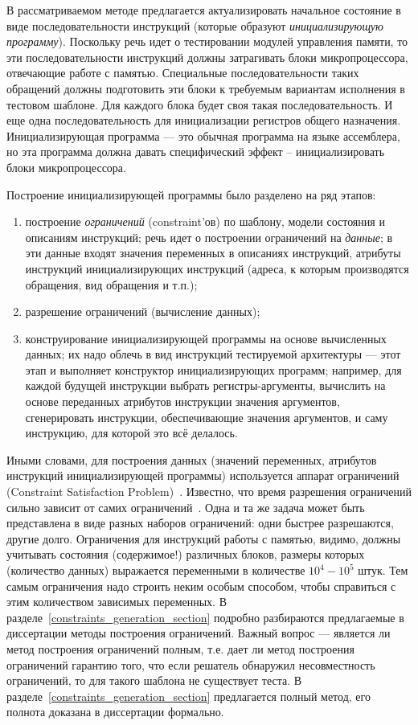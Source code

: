 \documentclass[14pt]{extreport}
\begin{document}
В рассматриваемом методе предлагается актуализировать начальное состояние в виде
последовательности инструкций (которые образуют \emph{инициализирующую
программу}). Поскольку речь идет о тестировании модулей управления памяти, то
эти последовательности инструкций должны затрагивать блоки микропроцессора,
отвечающие работе с памятью. Специальные последовательности таких обращений
должны подготовить эти блоки к требуемым вариантам исполнения в тестовом
шаблоне. Для каждого блока будет своя такая последовательность. И еще одна
последовательность для инициализации регистров общего назначения.
Инициализирующая программа --- это обычная программа на языке ассемблера, но эта
программа должна давать специфический эффект -- инициализировать блоки
микропроцессора.

Построение инициализирующей программы было разделено на ряд этапов:
\begin{enumerate}
  \item построение \emph{ограничений} (constraint'ов) по шаблону, модели
состояния и описаниям инструкций; речь идет о построении ограничений на
\emph{данные}; в эти данные входят значения переменных в описаниях инструкций,
атрибуты инструкций инициализирующих инструкций (адреса, к которым производятся
обращения, вид обращения и т.п.);
  \item разрешение ограничений (вычисление данных);
  \item конструирование инициализирующей программы на основе вычисленных данных;
их надо облечь в вид инструкций тестируемой архитектуры --- этот этап и
выполняет конструктор инициализирующих программ; например, для каждой будущей
инструкции выбрать регистры-аргументы, вычислить на основе переданных атрибутов
инструкции значения аргументов, сгенерировать инструкции, обеспечивающие
значения аргументов, и саму инструкцию, для которой это всё делалось.
\end{enumerate}

Иными словами, для построения данных (значений переменных, атрибутов инструкций
инициализирующей программы) используется аппарат ограничений (Constraint
Satisfaction Problem)~\cite{CSP}. Известно, что время разрешения ограничений
сильно зависит от самих ограничений~\cite{isaac05balanced}. Одна и та же задача
может быть представлена в виде разных наборов ограничений: одни быстрее
разрешаются, другие долго. Ограничения для инструкций работы с памятью, видимо,
должны учитывать состояния (содержимое!) различных блоков, размеры которых
(количество данных) выражается переменными в количестве $10^4-10^5$ штук. Тем
самым ограничения надо строить неким особым способом, чтобы справиться с этим
количеством зависимых переменных. В разделе~\ref{constraints_generation_section}
подробно разбираются предлагаемые в диссертации методы построения ограничений.
Важный вопрос --- является ли метод построения ограничений полным, т.е. дает ли
метод построения ограничений гарантию того, что если решатель обнаружил
несовместность ограничений, то для такого шаблона не существует теста. В
разделе~\ref{constraints_generation_section} предлагается полный метод, его
полнота доказана в диссертации формально.
\end{document}
